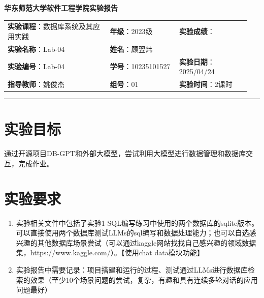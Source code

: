 \documentclass{article}
\begin{document}
	\begin{center}
		{\Large{\textbf{\heiti 华东师范大学软件工程学院实验报告}}}
		\begin{table}[htb]
			\flushleft
			\begin{tabular}{p{0.4\linewidth}p{0.27\linewidth}p{0.28\linewidth}}\\
				\textbf{实验课程}：数据库系统及其应用实践  & \textbf{年级}：2023级       & \textbf{实验成绩}：  \\
				\textbf{实验名称}：Lab-04 & \textbf{姓名}：顾翌炜         &                 \\
				\textbf{实验编号}：Lab-04     & \textbf{学号}：10235101527 & \textbf{实验日期}：2025/04/24  \\
				\textbf{指导教师}：姚俊杰     & \textbf{组号}：01            & \textbf{实验时间}：2课时  \\ 
			\end{tabular}
		\end{table}
	\end{center}
	\rule{\textwidth}{2pt}
	
	\makeatletter
	\renewcommand{\tableofcontents}{%
		\begin{multicols}{2}[\section*{\contentsname}]%
		\end{multicols}%
	}
	\makeatother
	
	\tableofcontents
	
	\clearpage
	
	\section{实验目标}
	
	通过开源项目DB-GPT和外部大模型，尝试利用大模型进行数据管理和数据库交互，完成作业。
	
	\section{实验要求}
	
	\begin{enumerate}[noitemsep, label={{\arabic*})}]
		\item 实验相关文件中包括了实验1-SQL编写练习中使用的两个数据库的sqlite版本。可以直接使用两个数据库测试LLMs的sql编写和数据处理能力；也可以自选感兴趣的其他数据库场景尝试（可以通过kaggle网站找找自己感兴趣的领域数据集，https://www.kaggle.com/）。【使用chat data模块功能】
		
		\item 实验报告中需要记录：项目搭建和运行的过程、测试通过LLMs进行数据库检索的效果（至少10个场景问题的尝试，复杂，有趣和具有连续多轮对话的应用问题最好）
	\end{enumerate}\textbf{}
	
\end{document}
